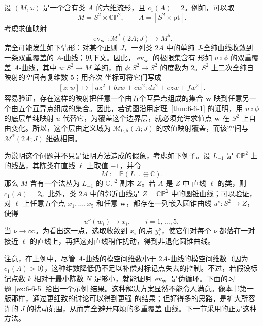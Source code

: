 \begin{example}\label{ex:6-6-4}
设 $(M,\omega)$ 是一个含有类 $A$ 的六维流形，且 $c_1(A)=2$。例如，可以取
\[
  M=S^2\times\mathbb{CP}^2,\qquad A=[S^2\times\mathrm{pt}].
\]
考虑求值映射
\[
  \operatorname{ev}_{\mathbf w}:
  \mathcal M^*(2A;J)\longrightarrow M^5.
\]
完全可能发生如下情形：对某个正则 $J$，一列类 $2A$ 中的单纯 $J$-全纯曲线收敛到
一条双重覆盖的 $A$-曲线；见下文。因此，$\operatorname{ev}_{\mathbf w}$ 的极限集含有
形如 $u\circ\phi$ 的双重覆盖 $A$-曲线，其中 $u:S^2\to M$ 单纯，而
$\phi:S^2\to S^2$ 的度数为 $2$。$S^2$ 上二次全纯自映射的空间有复维数 $5$；用齐次
坐标可将它们写成
\[
  [z:w]\longmapsto
  [az^2+bzw+cw^2:dz^2+ezw+fw^2].
\]
容易验证，存在这样的映射把任意一个由五个互异点组成的集合 $\mathbf w$ 映到任意另一
个由五个互异点组成的集合。因此，若试图沿用定理~\ref{thm:6-6-1} 的证明，用
$u\circ\phi$ 的底层单纯映射 $u$ 代替它，为覆盖这个边界层，就必须允许求值点
$\mathbf w$ 在 $S^2$ 上自由变化。所以，这个层由定义域为
$\mathcal M_{0,5}(A;J)$ 的求值映射覆盖，而该空间与
$\mathcal M^*(2A;J)$ 维数相同。

为说明这个问题并不只是证明方法造成的假象，考虑如下例子。设 $L_{-1}$ 是
$\mathbb{CP}^2$ 上的线丛，其陈类在直线 $\ell$ 上取值 $-1$，并令
\[
  M:=\mathbb P(L_{-1}\oplus\mathbb C).
\]
那么 $M$ 含有一个法丛为 $L_{-1}$ 的 $\mathbb{CP}^2$ 副本 $Z$。若 $A$ 是 $Z$ 中
直线 $\ell$ 的类，则 $c_1(A)=2$。此外，类 $2A$ 中的邻近曲线是
$Z=\mathbb{CP}^2$ 中的圆锥曲线；可以验证，对 $\ell$ 上任意五个点
$x_1,\ldots,x_5$ 和任意 $\mathbf w$，都存在一列嵌入圆锥曲线
$u^\nu:S^2\to Z$，使得
\[
  u^\nu(w_i)\longrightarrow x_i,\qquad i=1,\ldots,5,
\]
当 $\nu\to\infty$。为看出这一点，选取收敛到 $x_i$ 的点 $y_i^\nu$，使它们对每个
$\nu$ 都落在一对接近 $\ell$ 的直线上，再把这对直线稍作扰动，得到非退化圆锥曲线。
\end{example}

注意，在上例中，尽管 $A$-曲线的模空间维数小于 $2A$-曲线的模空间维数（因为
$c_1(A)>0$），这种维数降低仍不足以补偿对标记点失去的控制。不过，若假设标记点数
$k$ 相对于最小陈数 $N$ 足够小，就能证明
$\operatorname{ev}_{\mathbf w}$ 是伪循环。下面的习题~\ref{ex:6-6-5} 给出一个示例
结果。这种解决方案显然不能令人满意。像本书第一版那样，通过更细致的讨论可以得到更强
的结果；但好得多的思路，是扩大所容许的 $J$ 的扰动范围，从而完全避开麻烦的多重覆盖
曲线。下一节采用的正是这种方法。

